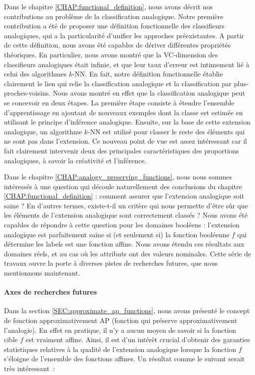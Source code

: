 Dans le chapitre \ref{CHAP:functional_definition}, nous avons décrit nos
contributions au problème de la classification analogique. Notre première
contribution a été de proposer une définition fonctionnelle des classifieurs
analogiques, qui a la particularité d'unifier les approches préexistantes. A
partir de cette définition, nous avons été capables de dériver différentes
propriétés théoriques. En particulier, nous avons montré que la VC-dimension
des classifieurs analogiques était infinie, et que leur taux d'erreur est
intimement lié à celui des algorithmes $k$-NN. En fait, notre définition
fonctionnelle établie clairement le lien qui relie la classification analogique
et la classification par plus-proches-voisins. Nous avons montré en effet que
la classification analogique peut se concevoir en deux étapes. La première
étape consiste à étendre l'ensemble d'apprentissage en ajoutant de nouveaux
exemples dont la classe est estimée en utilisant le principe d'inférence
analogique. Ensuite, sur la base de cette extension analogique, un algorithme
$k$-NN est utilisé pour classer le reste des éléments qui ne sont pas dans
l'extension. Ce nouveau point de vue est assez intéressant car il fait
clairement intervenir deux des principales caractéristiques des proportions
analogiques, à savoir la créativité et l'inférence.

Dans le chapitre \ref{CHAP:analogy_preserving_functions}, nous nous sommes
intéressés à une question qui découle naturellement des conclusions du chapitre
\ref{CHAP:functional_definition} : comment assurer que l'extension analogique
soit saine ? En d'autres termes, existe-t-il un critère qui nous permette
d'être sûr que les éléments de l'extension analogique sont correctement
classés ? Nous avons été capables de répondre à cette question  pour les
domaines booléens : l'extension analogique est parfaitement saine si (et
seulement si) la fonction booléenne $f$ qui détermine les labels est une
fonction affine. Nous avons étendu ces résultats aux domaines réels, et au cas
où les attributs ont des valeurs nominales. Cette série de travaux ouvre la
porte à diverses pistes de recherches futures, que nous mentionnons maintenant.

\paragraph{Axes de recherches futures\\}

Dans la section \ref{SEC:approximate_ap_functions}, nous avons présenté le
concept de fonction approximativement AP (fonction qui préserve
approximativement l'analogie). En effet en pratique, il n'y a aucun moyen de
savoir si la fonction cible $f$ est vraiment affine. Ainsi, il est d'un intérêt
crucial d'obtenir des garanties statistiques relatives à la qualité de
l'extension analogique lorsque la fonction $f$ s'éloigne de l'ensemble des
fonctions affines. Un résultat comme le suivant serait très intéressant~:

